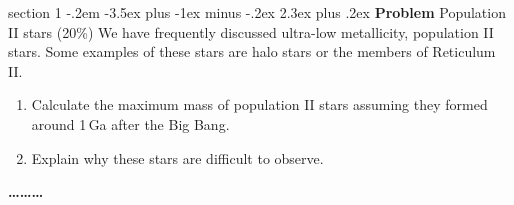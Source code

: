 \documentclass[letterpaper,12pt,twoside=false,DIV=11]{scrartcl}
\makeatletter
\newenvironment{problem}{\@startsection
    {section}
    {1}
    {-.2em}
    {-3.5ex plus -1ex minus -.2ex}
    {2.3ex plus .2ex}
    {
        \pagebreak[3] %
        \noindent\sffamily\bfseries Problem
    }
}
{
    \begin{center}\large\bfseries\ldots\ldots\ldots\end{center}
}
\makeatother
\begin{document}
\begin{problem}{Population II stars (20\%)}
We have frequently discussed ultra-low metallicity, population II stars. Some examples of these stars are halo stars or the members of Reticulum II. 
\begin{enumerate}
    \item Calculate the maximum mass of population II stars assuming they formed around 1\,Ga after the Big Bang.
    \item Explain why these stars are difficult to observe.
\end{enumerate}
\end{problem}
\end{document}
